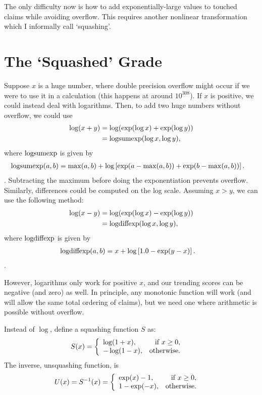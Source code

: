 \documentclass[a4paper, 12pt]{article}
\newcommand{\logsumexp}{\textnormal{logsumexp}}
\newcommand{\logdiffexp}{\textnormal{logdiffexp}}
\begin{document}
The only difficulty now is how to add exponentially-large values to touched
claims while avoiding overflow. This requires another nonlinear transformation
which I informally call `squashing'.

\section{The `Squashed' Grade}
Suppose $x$ is a huge number, where double precision overflow might occur if
we were to use it in a calculation (this happens at around $10^{308}$).
If $x$ is positive, we could instead deal with logarithms. Then, to add
two huge numbers without overflow, we could use
\begin{align}
\log(x + y)  &= \log(\exp(\log x) + \exp(\log y)) \\
             &= \logsumexp(\log x, \log y),
\end{align}
where $\logsumexp$ is given by
\begin{align}
\logsumexp(a, b) &= \max(a, b)
        + \log\left[\exp(a - \max(a, b)) + \exp(b - \max(a, b))\right].
\end{align}.
Subtracting the maximum before doing the exponentiation prevents overflow.
Similarly, differences could be computed on the log scale. Assuming $x>y$,
we can use the following method:
\begin{align}
\log(x - y)  &= \log(\exp(\log x) - \exp(\log y)) \\
             &= \logdiffexp(\log x, \log y),
\end{align}
where $\logdiffexp$ is given by
\begin{align}
\logdiffexp(a, b) &= x
        + \log\left[1.0 - \exp(y - x)\right].
\end{align}.

However,
logarithms only work for positive $x$, and our trending scores can be
negative (and zero) as well. In principle, any monotonic function will work
(and will allow the same total ordering of claims),
but we need one where arithmetic is possible without overflow.

Instead of $\log$, define a squashing function $S$ as:
\begin{align}
S(x) &=
    \left\{
        \begin{array}{lr}
            \log (1 + x), & \textnormal{if } x \geq 0, \\
            -\log(1 - x), & \textnormal{otherwise}.
        \end{array}
    \right.
\end{align}
The inverse, unsquashing function, is
\begin{align}
U(x) = S^{-1}(x) &=
    \left\{
        \begin{array}{lr}
            \exp(x) - 1,  & \textnormal{if } x \geq 0, \\
            1 - \exp(-x), & \textnormal{otherwise}.
        \end{array}
    \right.
\end{align}
\end{document}
